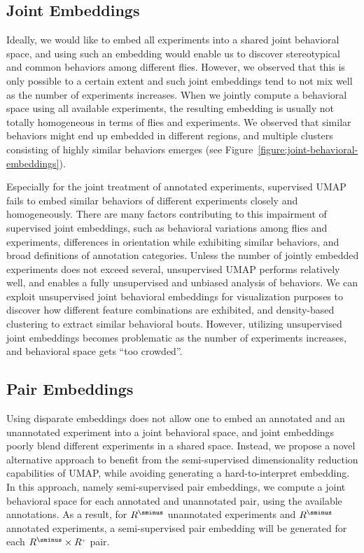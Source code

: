 \subsection{Joint Embeddings}\label{section:joint-embeddings}
Ideally, we would like to embed all experiments into a shared joint behavioral space, and using such an embedding would enable us to discover stereotypical and common behaviors among different flies.
However, we observed that this is only possible to a certain extent and such joint embeddings tend to not mix well as the number of experiments increases.
When we jointly compute a behavioral space using all available experiments,  the resulting embedding is usually not totally homogeneous in terms of flies and experiments.
We observed that similar behaviors might end up embedded in different regions, and multiple clusters consisting of highly similar behaviors emerges (see Figure~\ref{figure:joint-behavioral-embeddings}).

Especially for the joint treatment of annotated experiments, supervised UMAP fails to embed similar behaviors of different experiments closely and homogeneously.
There are many factors contributing to this impairment of supervised joint embeddings, such as behavioral variations among flies and experiments,  differences in orientation while exhibiting similar behaviors, and broad definitions of annotation categories.
Unless the number of jointly embedded experiments does not exceed several, unsupervised UMAP performs relatively well, and enables a fully unsupervised and unbiased analysis of behaviors.
We can exploit unsupervised joint behavioral embeddings for visualization purposes to discover how different feature combinations are exhibited, and density-based clustering to extract similar behavioral bouts.
However, utilizing unsupervised joint embeddings becomes problematic as the number of experiments increases, and behavioral space gets ``too crowded''.

\subsection{Pair Embeddings}\label{section:pair-embeddings}
Using disparate embeddings does not allow one to embed an annotated and an unannotated experiment into a joint behavioral space, and joint embeddings poorly blend different experiments in a shared space.
Instead, we propose a novel alternative approach to benefit from the semi-supervised dimensionality reduction capabilities of UMAP, while avoiding generating a hard-to-interpret embedding.
In this approach, namely semi-supervised pair embeddings, we compute a joint behavioral space for each annotated and unannotated pair, using the available annotations.
As a result, for $\Unann{R}$ unannotated experiments and  $\Unann{R}$ annotated experiments, a semi-supervised pair embedding will be generated for each $\Unann{R} \times \Ann{R}$ pair.

